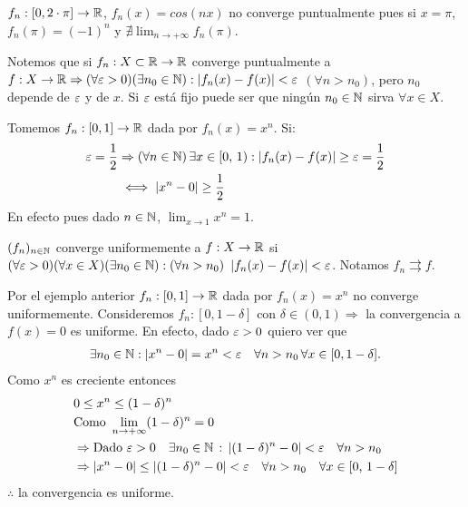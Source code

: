 \begin{eg}
  $f_n: [0, 2 \cdot \pi] \to \mathbb{R}$, $f_n(x) = cos(nx)$ no converge puntualmente pues si $x = \pi$, $f_n(\pi) = (-1)^n$ y $\nexists \lim_{n \to +\infty} f_n(\pi)$.
\end{eg}

Notemos que si $f_n: X \subset \mathbb{R} \to \mathbb{R}$ converge puntualmente a $f: X \to \mathbb{R} \Rightarrow (\forall \varepsilon > 0)(\exists n_0 \in \mathbb{N}) : |f_n(x) - f(x)| < \varepsilon$ $(\forall n > n_0)$, pero $n_0$ depende de $\varepsilon$ y de $x$. Si $\varepsilon$ está fijo puede ser que ningún $n_0 \in \mathbb{N}$ sirva $\forall x \in X$.

\begin{eg}
  Tomemos $f_n: [0, 1] \to \mathbb{R}$ dada por $f_n(x) = x^n$. Si: \begin{align*}
    \varepsilon = \frac{1}{2} & \Rightarrow (\forall n \in \mathbb{N}) \, \exists x \in [0\text{, }1) : |f_n(x) - f(x)| \geq \varepsilon = \frac{1}{2} \\
                     & \iff |x^n - 0| \geq \frac{1}{2}
  \end{align*}
  En efecto pues dado $n \in \mathbb{N}$, $\lim_{x \to 1} x^n = 1$.
\end{eg}

\begin{definition}
  $(f_n)_{n \in \mathbb{N}}$ converge uniformemente a $f: X \to \mathbb{R}$ si $(\forall \varepsilon > 0)(\forall x \in X)(\exists n_0 \in \mathbb{N}) : (\forall n > n_0)$ $ |f_n(x) - f(x)| < \varepsilon$. Notamos $f_n \rightrightarrows f$.
\end{definition}

\begin{eg}
  Por el ejemplo anterior $f_n: [0, 1] \to \mathbb{R}$ dada por $f_n(x) = x^n$ no converge uniformemente.
  Consideremos $f_n: [0, 1 - \delta]$ con $\delta \in (0, 1) \Rightarrow$ la convergencia a $f(x) = 0$ es uniforme.
  En efecto, dado $\varepsilon > 0$ quiero ver que
  \begin{align*}
    \exists n_0 \in \mathbb{N} : |x^n - 0| = x^n < \varepsilon \quad \forall n > n_0 \, \forall x \in [0, 1 - \delta].
  \end{align*}
  Como $x^n$ es creciente entonces
  \begin{align*}
     & 0 \leq x^n \leq (1 - \delta)^n                                                                                      \\
     & \text{Como } \lim_{n \to +\infty} (1 - \delta)^n = 0                                                                \\
     & \Rightarrow \text{Dado } \varepsilon > 0 \quad \exists n_0 \in \mathbb{N} \, : \, |(1 - \delta)^n - 0 | < \varepsilon \quad \forall n > n_0   \\
     & \Rightarrow |x^n - 0| \leq |(1 - \delta)^n - 0| < \varepsilon \quad \forall n > n_0 \quad \forall x \in [0\text{, }1-\delta]
  \end{align*}
  $\therefore$ la convergencia es uniforme.
\end{eg}

